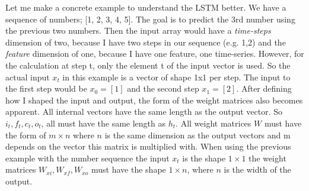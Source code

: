 Let me make a concrete example to understand the LSTM better.
We have a sequence of numbers; [1, 2, 3, 4, 5].
The goal is to predict the 3rd number using the previous two numbers. Then the input array would have a \textit{time-steps} dimension of two, because I have two steps in our sequence (e.g. 1,2) and the \textit{feature} dimension of one, because I have one feature, one time-series.
However, for the calculation at step t, only the element t of the input vector is used.
So the actual input $x_t$ in this example is a vector of shape 1x1 per step.
The input to the first step would be $x_0 = [1]$ and the second step $x_1 = [2]$.
After defining how I shaped the input and output, the form of the weight matrices also becomes apparent.
All internal vectors have the same length as the output vector.
So ${i}_{t}, {f}_{t}, {c}_{t}, {o}_{t}$, all must have the same length as ${h}_{t}$.
All weight matrices $W$ must have the form of $m\times n$ where $n$ is the same dimension as the output vectors and m depends on the vector this matrix is multiplied with.
When using the previous example with the number sequence the input $x_t$ is the shape $1\times 1$ the weight matrices ${W}_{xi},{W}_{xf},{W}_{xo}$ must have the shape $1\times n$, where $n$ is the width of the output.

